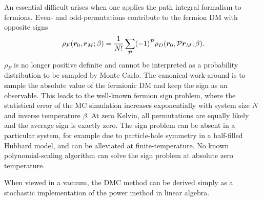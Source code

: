 An essential difficult arises when one applies the path integral formalism to fermions. Even- and odd-permutations contribute to the fermion DM with opposite signs
\begin{align}
\rho_F(\boldsymbol{r}_0,\boldsymbol{r}_M;\beta) = \frac{1}{N!}\sum\limits_{\mathcal{P}} (-1)^{\mathcal{P}} \rho_D(\boldsymbol{r}_0, \mathcal{P}\boldsymbol{r}_M;\beta).
\end{align}
$\rho_F$ is no longer positive definite and cannot be interpreted as a probability distribution to be sampled by Monte Carlo. The canonical work-around is to sample the absolute value of the fermionic DM and keep the sign as an observable. This leads to the well-known fermion sign problem, where the statistical error of the MC simulation increases exponentially with system size $N$ and inverse temperature $\beta$. At zero Kelvin, all permutations are equally likely and the average sign is exactly zero. The sign problem can be absent in a particular system, for example due to particle-hole symmetry in a half-filled Hubbard model, and can be alleviated at finite-temperature. No known polynomial-scaling algorithm can solve the sign problem at absolute zero temperature.


When viewed in a vacuum, the DMC method can be derived simply as a stochastic implementation of the power method in linear algebra.

\begin{comment}
Minus natural logarithm of the DM is defined to be the ``action''
\begin{align}
S\equiv-\ln \rho,
\end{align}
and the exponent in eq.~(\ref{eq:pimc-rhod}) is the so-called primitive approximation to the action, which slowly becomes exact as time step goes to zero $\tau\rightarrow0$. Faster time-step convergence can be achieved using better approximation to the action.
\end{comment}

\begin{comment}
\begin{table}[h]
\centering
\begin{tabular}{cccccc}
\toprule
     & Temperature & Classical & Quantum & Quantization & Sign Problem \\
\midrule
PIMC &     any     &   yes     &   yes   & first & $\braket{\sigma}\propto \exp\left[ -\beta N (F_f-F_b) \right]$ \\
DMC  &    zero     &    no     &   yes   & first & $\braket{\sigma}\propto \exp\left[ -\beta N (F_f-F_T) \right]$ \\
FP-DMC & zero & no & yes & first & no \\
VMC & low & no & yes & first & no \\
AFQMC & low & no & yes & second & ? \\
\bottomrule
\end{tabular}
\end{table}
\end{comment}

